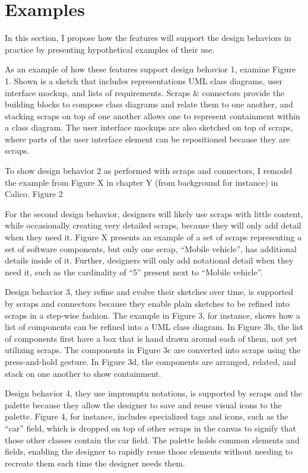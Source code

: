 \documentclass[12pt,fleqn]{ucithesis}
\begin{document}
\section{Examples}

In this section, I propose how the features will support the design behaviors in practice by presenting hypothetical examples of their use.

As an example of how these features support design behavior 1, examine Figure 1. Shown is a sketch that includes representations UML class diagrams, user interface mockup, and lists of requirements. Scraps \& connectors provide the building blocks to compose class diagrams and relate them to one another, and stacking scraps on top of one another allows one to represent containment within a class diagram. The user interface mockups are also sketched on top of scraps, where parts of the user interface element can be repositioned because they are scraps.

To show design behavior 2 as performed with scraps and connectors, I remodel the example from Figure X in chapter Y (from background for instance) in Calico.  Figure 2

For the second design behavior, designers will likely use scraps with little content, while occasionally creating very detailed scraps, because they will only add detail when they need it. Figure X presents an example of a set of scraps representing a set of software components, but only one scrap, ``Mobile vehicle'', has additional details inside of it. Further, designers will only add notational detail when they need it, such as the cardinality of ``5'' present next to ``Mobile vehicle''.

Design behavior 3, they refine and evolve their sketches over time, is supported by scraps and connectors because they enable plain sketches to be refined into scraps in a step-wise fashion. The example in Figure 3, for instance, shows how a list of components can be refined into a UML class diagram. In Figure 3b, the list of components first have a box that is hand drawn around each of them, not yet utilizing scraps. The components in Figure 3c are converted into scraps using the press-and-hold gesture. In Figure 3d, the components are arranged, related, and stack on one another to show containment. 

Design behavior 4, they use impromptu notations, is supported by scraps and the palette because they allow the designer to save and reuse visual icons to the palette. Figure 4, for instance, includes specialized tags and icons, such as the ``car'' field, which is dropped on top of other scraps in the canvas to signify that those other classes contain the car field. The palette holds common elements and fields, enabling the designer to rapidly reuse those elements without needing to recreate them each time the designer needs them.
\end{document}
